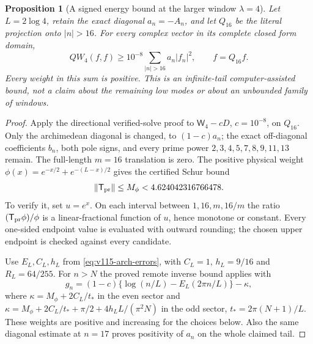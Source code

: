 \documentclass[11pt]{article}
\newtheorem{proposition}[theorem]{Proposition}
\theoremstyle{remark}
\begin{document}
\begin{proposition}[A signed energy bound at the larger window $\lambda=4$]
\label{prop:v120-lambda4-tail}
Let $L=2\log4$, retain the exact diagonal $a_n=-A_n$, and let
$Q_{16}$ be the literal projection onto $|n|>16$. For every complex
vector in its complete closed form domain,
\begin{equation}\label{eq:v120-lambda4-tail}
 QW_4(f,f)\ge10^{-8}\sum_{|n|>16}a_n|f_n|^2,
 \qquad f=Q_{16}f.
\end{equation}
Every weight in this sum is positive. This is an infinite-tail
computer-assisted bound, not a claim about the remaining low modes
or about an unbounded family of windows.
\end{proposition}
\begin{proof}
Apply the directional verified-solve proof to
$\mathsf W_4-cD$, $c=10^{-8}$, on $Q_{16}$.
Only the archimedean diagonal is changed, to $(1-c)a_n$;
the exact off-diagonal coefficients $b_n$, both pole signs, and every
prime power $2,3,4,5,7,8,9,11,13$ remain. The full-length $m=16$
translation is zero. The positive physical weight
$\phi(x)=e^{-x/2}+e^{-(L-x)/2}$ gives the certified Schur bound
\begin{equation}\label{eq:v120-lambda4-prime-bound}
 \|\mathsf T_{\rm pr}\|
 \le M_\phi<4.624042316766478.
\end{equation}
To verify it, set $u=e^x$. On each interval between
$1,16,m,16/m$ the ratio $(\mathsf T_{\rm pr}\phi)/\phi$
is a linear-fractional function of $u$, hence monotone or constant.
Every one-sided endpoint value is evaluated with outward rounding;
the chosen upper endpoint is checked against every candidate.

Use $E_L,C_L,h_L$ from \eqref{eq:v115-arch-errors}, with
$C_L=1$, $h_L=9/16$ and $R_L=64/255$. For $n>N$ the proved
remote inverse bound applies with
\[
 g_n=(1-c)\{\log(n/L)-E_L(2\pi n/L)\}-\kappa,
\]
where $\kappa=M_\phi+2C_L/t_*$ in the even sector and
$\kappa=M_\phi+2C_L/t_*+\pi/2+4h_LL/(\pi^2N)$ in the odd
sector, $t_*=2\pi(N+1)/L$. These weights are positive and
increasing for the choices below. Also the same diagonal estimate
at $n=17$ proves positivity of $a_n$ on the whole claimed tail.


\end{proof}
\end{document}
